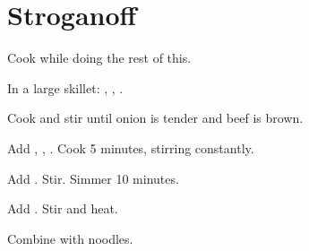 \section{Stroganoff}

Cook 
while doing the rest of this.

In a large skillet:
,
,
.

Cook and stir until onion is tender and beef is brown.

Add
,
,
.
Cook 5 minutes, stirring constantly.

Add .
Stir. Simmer 10 minutes.

Add . Stir and heat.

Combine with noodles.


